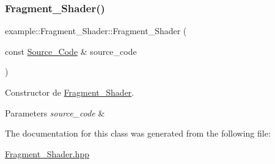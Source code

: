 \subsubsection{\texorpdfstring{Fragment\_Shader()}{Fragment\_Shader()}}
{\footnotesize\ttfamily example\+::\+Fragment\+\_\+\+Shader\+::\+Fragment\+\_\+\+Shader (\begin{DoxyParamCaption}\item[{const \mbox{\hyperlink{classexample_1_1_shader_1_1_source___code}{Source\+\_\+\+Code}} \&}]{source\+\_\+code }\end{DoxyParamCaption})\hspace{0.3cm}{\ttfamily [inline]}}



Constructor de \mbox{\hyperlink{classexample_1_1_fragment___shader}{Fragment\+\_\+\+Shader}}. 


\begin{DoxyParams}{Parameters}
{\em source\+\_\+code} & \\
\hline
\end{DoxyParams}


The documentation for this class was generated from the following file\+:\begin{DoxyCompactItemize}
\item 
\mbox{\hyperlink{_fragment___shader_8hpp}{Fragment\+\_\+\+Shader.\+hpp}}\end{DoxyCompactItemize}
